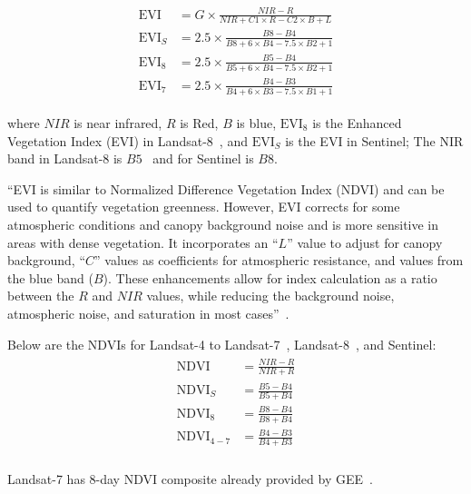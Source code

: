 \documentclass{article}
\begin{document}
\begin{gather}
\label{eq:EVILandsat8}
\begin{aligned}
\text{EVI} &= G \times \frac{NIR - R}{NIR + C1 \times R - C2 \times B + L} \\
\text{EVI}_S &= 2.5 \times \frac{B8 - B4}{B8 + 6 \times B4 - 7.5 \times B2 + 1}\\
\text{EVI}_8 &= 2.5 \times \frac{B5 - B4}{B5 + 6 \times B4 - 7.5 \times B2 + 1} \\
\text{EVI}_7 &= 2.5 \times \frac{B4 - B3}{B4 + 6 \times B3 - 7.5 \times B1 + 1}
\end{aligned}
\end{gather} 

\noindent where $NIR$ is near infrared, $R$ is Red,
$B$ is blue, 
$\text{EVI}_8$ is the Enhanced Vegetation Index (EVI) 
in Landsat-8~\cite{Landsat8EVI}, 
and $\text{EVI}_S$
is the EVI in Sentinel; The NIR band in
Landsat-8 is $B5$~\cite{L8BandNames}
and for Sentinel is $B8$.

``EVI is similar to Normalized Difference 
Vegetation Index (NDVI) and can be used 
to quantify vegetation greenness. However, 
EVI corrects for some atmospheric conditions 
and canopy background noise and is more 
sensitive in areas with dense vegetation. 
It incorporates an ``$L$'' value to adjust for 
canopy background, ``$C$'' values as coefficients 
for atmospheric resistance, and values from 
the blue band ($B$).  These enhancements allow 
for index calculation as a ratio between 
the $R$ and $NIR$ values, while reducing the 
background noise, atmospheric noise, and 
saturation in most cases''~\cite{Landsat8EVI}.

Below are the NDVIs for 
Landsat-4 to Landsat-7~\cite{Landsat4NDVI},
Landsat-8~\cite{Landsat4NDVI}, and Sentinel:
\begin{gather}
\label{eq:NDVILandsat8}
\begin{aligned}
\text{NDVI} &= \frac{NIR - R}{NIR + R}\\
\text{NDVI}_S &= \frac{B5 - B4}{B5 + B4}\\
\text{NDVI}_8 &= \frac{B8 - B4}{B8 + B4} \\
\text{NDVI}_{4-7} &= \frac{B4 - B3}{B4 + B3} \\
\end{aligned}
\end{gather}

Landsat-7 has 8-day NDVI composite already provided 
by GEE~\cite{Landsat7NDVIComposite}.





\end{document}
